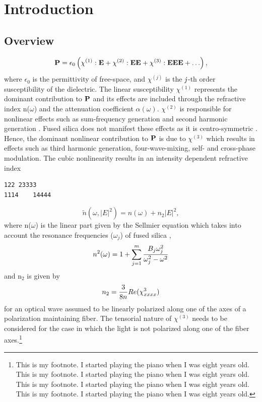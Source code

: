 

\renewcommand{\thechapter}{1}

\chapter{Introduction}

\section{Overview}




\begin{equation}
{\bf P} = \epsilon_{0} \left( \chi^{(1)} : {\bf E} + \chi^{(2)}
: {\bf EE} + \chi^{(3)} : {\bf EEE} + \ldots \right),
\end{equation}
where $\epsilon_0$ is the permittivity of free-space, and
$\chi^{(j)}$
is the ${\it j}$-th order susceptibility of the dielectric. The linear
susceptibility $\chi^{(1)}$ represents the dominant contribution to
$\bf{P}$ and its effects are included through the refractive index
n($\omega$) and the attenuation coefficient $\alpha(\omega)$. $\chi^{(2)}$
is responsible for nonlinear effects such as sum-frequency generation and
second harmonic generation \cite{Agrawal1, Shen}. Fused silica does not
manifest these effects as it is centro-symmetric \cite{Newell}. Hence, the dominant nonlinear
contribution to ${\bf P}$ is due to $\chi^{(3)}$ which results in effects
such as third harmonic generation, four-wave-mixing,  self- and
cross-phase modulation. The cubic nonlinearity results in an intensity
dependent refractive index

\begin{verbatim}
122 23333
1114    14444
\end{verbatim}

\begin{equation}
\tilde{n}(\omega,|E|^2) = n(\omega)+n_2|E|^2 ,
\end{equation}
where n($\omega$) is the linear part given by the Sellmier
equation which
takes into account the resonance frequencies ($\omega_j$) of fused
silica \cite{Agrawal1,Marcuse},
\begin{equation}
n^2(\omega) = 1 + \sum_{j=1}^m {B_j\omega^2_j \over \omega^2_j - \omega^2}
\end{equation}
and n$_2$ is given by
\begin{equation}
n_2 = {3 \over 8n}Re(\chi_{xxxx}^3)
\end{equation}
for an optical wave assumed to be linearly polarized along one of the
axes of a polarization maintaining fiber. The tensorial nature of $\chi^{(3)}$ needs to be
considered for the case in which the light is not polarized along one of
the fiber axes.\footnote{This is my footnote.  I started playing the piano when I was eight years old.  This is my footnote.  I started playing the piano when I was eight years old.  This is my footnote.  I started playing the piano when I was eight years old.  This is my footnote.  I started playing the piano when I was eight years old.}

